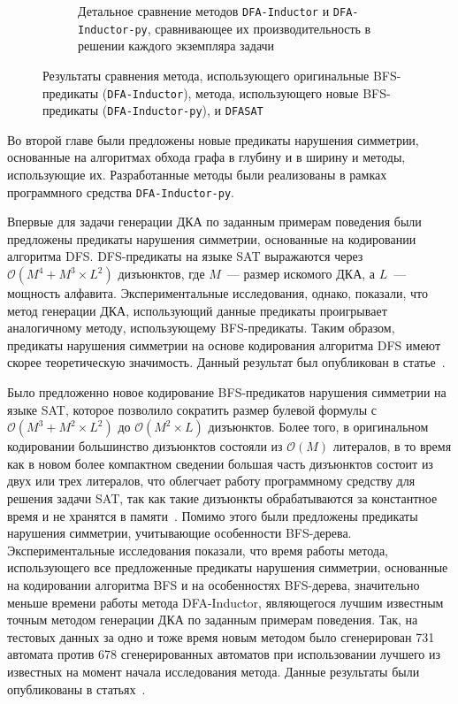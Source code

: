 \begin{figure}[ht]
\begin{subfigure}[b]{0.48\textwidth}
    \caption{Детальное сравнение методов \texttt{DFA-Inductor} и \texttt{DFA-Inductor-py}, сравнивающее их производительность в решении каждого экземпляра задачи}
    \label{img:plots:scatter}
  \end{subfigure}
  \caption{Результаты сравнения метода, использующего оригинальные BFS-предикаты (\texttt{DFA-Inductor}), метода, использующего новые BFS-предикаты (\texttt{DFA-Inductor-py}), и \texttt{DFASAT}}
  \label{img:plots}
\end{figure}



\chresults{\ref{sec:space}}

Во второй главе были предложены новые предикаты нарушения симметрии, основанные на алгоритмах обхода графа в глубину и в ширину и методы, использующие их.
Разработанные методы были реализованы в рамках программного средства \texttt{DFA-Inductor-py}.

Впервые для задачи генерации ДКА по заданным примерам поведения были предложены предикаты нарушения симметрии, основанные на кодировании алгоритма DFS.
DFS-предикаты на языке SAT выражаются через $\mathcal{O}\left(M^4 + M^3 \times L^2\right)$ дизъюнктов, где $M$~--- размер искомого ДКА, а $L$~--- мощность алфавита.
Экспериментальные исследования, однако, показали, что метод генерации ДКА, использующий данные предикаты проигрывает аналогичному методу, использующему BFS-предикаты.
Таким образом, предикаты нарушения симметрии на основе кодирования алгоритма DFS имеют скорее теоретическую значимость.
Данный результат был опубликован в статье~\cite{zakirzyanov2017DataMode}.

Было предложенно новое кодирование BFS-предикатов нарушения симметрии на языке SAT, которое позволило сократить размер булевой формулы с $\mathcal{O}\left(M^3 + M^2 \times L^2\right)$  до $\mathcal{O}\left(M^2 \times L\right)$ дизъюнктов.
Более того, в оригинальном кодировании большинство дизъюнктов состояли из $\mathcal{O}\left(M\right)$ литералов, в то время как в новом более компактном сведении большая часть дизъюнктов состоит из двух или трех литералов, что облегчает работу программному средству для решения задачи SAT, так как такие дизъюнкты обрабатываются за константное время и не хранятся в памяти~\cite{MSilva-SATbook09}.
Помимо этого были предложены предикаты нарушения симметрии, учитывающие особенности BFS-дерева.
Экспериментальные исследования показали, что время работы метода, использующего все предложенные предикаты нарушения симметрии, основанные на кодировании алгоритма BFS и на особенностях BFS-дерева, значительно меньше времени работы метода DFA-Inductor, являющегося лучшим известным точным методом генерации ДКА по заданным примерам поведения.
Так, на тестовых данных за одно и тоже время новым методом было сгенерирован 731 автомата против 678 сгенерированных автоматов при использовании лучшего из известных на момент начала исследования метода.
Данные результаты были опубликованы в статьях~\cite{zakirzyanov2015LATA,zakirzyanov2019LATA}.